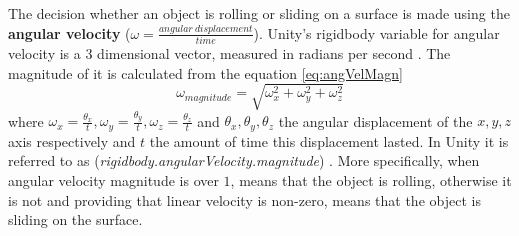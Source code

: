 The decision whether an object is rolling or sliding on a surface is made using the \textbf{angular velocity} ($\omega = \frac{angular\ displacement}{time}$). Unity\textsuperscript{\textregistered}'s rigidbody variable for angular velocity is a 3 dimensional vector, measured in radians per second \cite{bib:unity_doc}. The magnitude of it is calculated from the equation \ref{eq:angVelMagn}
\begin{equation}\label{eq:angVelMagn}
\omega_{magnitude} = \sqrt{\omega_x^2+\omega_y^2+\omega_z^2}
\end{equation}
where $\omega_x = \frac{\theta_x}{t}, \omega_y = \frac{\theta_y}{t}, \omega_z = \frac{\theta_z}{t}$ and $\theta_x, \theta_y, \theta_z$ the angular displacement of the $x, y, z$ axis respectively and $t$ the amount of time this displacement lasted. In Unity\textsuperscript{\textregistered} it is referred to as (\textit{rigidbody.angularVelocity.magnitude}) \cite{bib:unity_doc}. More specifically, when angular velocity magnitude is over $1$, means that the object is rolling, otherwise it is not and providing that linear velocity is non-zero, means that the object is sliding on the surface. 









